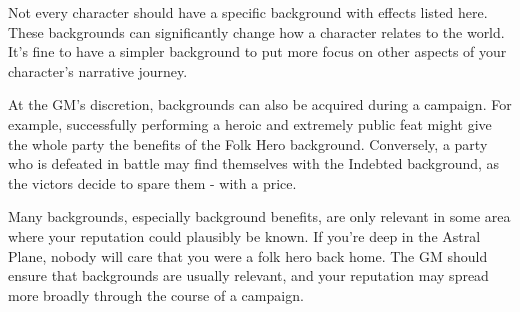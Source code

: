     Not every character should have a specific background with effects listed here.
    These backgrounds can significantly change how a character relates to the world.
    It's fine to have a simpler background to put more focus on other aspects of your character's narrative journey.

    At the GM's discretion, backgrounds can also be acquired during a campaign.
    For example, successfully performing a heroic and extremely public feat might give the whole party the benefits of the Folk Hero background.
    Conversely, a party who is defeated in battle may find themselves with the Indebted background, as the victors decide to spare them - with a price.

    Many backgrounds, especially background benefits, are only relevant in some area where your reputation could plausibly be known.
    If you're deep in the Astral Plane, nobody will care that you were a folk hero back home.
    The GM should ensure that backgrounds are usually relevant, and your reputation may spread more broadly through the course of a campaign.

